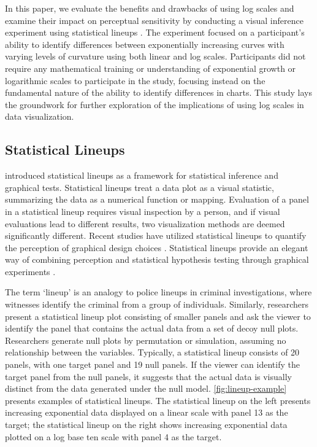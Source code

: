 \documentclass[12pt]{article}
\begin{document}
In this paper, we evaluate the benefits and drawbacks of using log
scales and examine their impact on perceptual sensitivity by conducting
a visual inference experiment using statistical lineups
\citep{buja_statistical_2009}. The experiment focused on a participant's
ability to identify differences between exponentially increasing curves
with varying levels of curvature using both linear and log scales.
Participants did not require any mathematical training or understanding
of exponential growth or logarithmic scales to participate in the study,
focusing instead on the fundamental nature of the ability to identify
differences in charts. This study lays the groundwork for further
exploration of the implications of using log scales in data
visualization.

\hypertarget{statistical-lineups}{%
\subsection{Statistical Lineups}\label{statistical-lineups}}

\citet{buja_statistical_2009} introduced statistical lineups as a
framework for statistical inference and graphical tests. Statistical
lineups treat a data plot as a visual statistic, summarizing the data as
a numerical function or mapping. Evaluation of a panel in a statistical
lineup requires visual inspection by a person, and if visual evaluations
lead to different results, two visualization methods are deemed
significantly different. Recent studies have utilized statistical
lineups to quantify the perception of graphical design choices
\citep{hofmann_graphical_2012, loy_model_2017, loy_variations_2016, vanderplas_clusters_2017}.
Statistical lineups provide an elegant way of combining perception and
statistical hypothesis testing through graphical experiments
\citep{majumder_validation_2013, vanderplas_testing_2020, wickham2010graphical}.

The term `lineup' is an analogy to police lineups in criminal
investigations, where witnesses identify the criminal from a group of
individuals. Similarly, researchers present a statistical lineup plot
consisting of smaller panels and ask the viewer to identify the panel
that contains the actual data from a set of decoy null plots.
Researchers generate null plots by permutation or simulation, assuming
no relationship between the variables. Typically, a statistical lineup
consists of 20 panels, with one target panel and 19 null panels. If the
viewer can identify the target panel from the null panels, it suggests
that the actual data is visually distinct from the data generated under
the null model. \cref{fig:lineup-example} presents examples of
statistical lineups. The statistical lineup on the left presents
increasing exponential data displayed on a linear scale with panel 13 as
the target; the statistical lineup on the right shows increasing
exponential data plotted on a log base ten scale with panel 4 as the
target.
\end{document}
